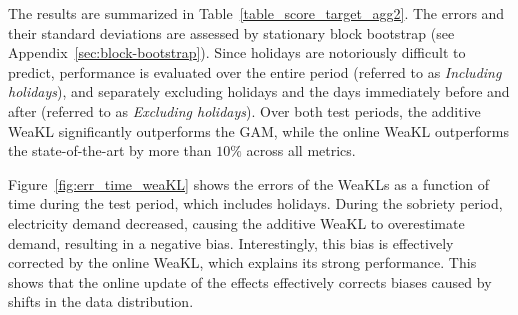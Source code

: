 The results are summarized in Table~\ref{table_score_target_agg2}. The errors and their standard deviations are assessed by stationary block bootstrap (see Appendix~\ref{sec:block-bootstrap}). Since holidays are notoriously difficult to predict, performance is evaluated over the entire period (referred to as \textit{Including holidays}), and separately excluding holidays and the days immediately before and after (referred to as \textit{Excluding holidays}). 
Over both test periods, the additive WeaKL  significantly outperforms the GAM, while the online WeaKL outperforms the state-of-the-art by more than $10\%$ across all metrics.


Figure~\ref{fig:err_time_weaKL} shows the errors of the WeaKLs as a function of time during the test period, which includes holidays. 
During the sobriety period, electricity demand decreased, causing the additive WeaKL to overestimate demand, resulting in a negative bias. Interestingly, this bias is effectively corrected by the online WeaKL, which explains its strong performance. This shows that the online update of the effects effectively corrects biases caused by shifts in the data distribution.

